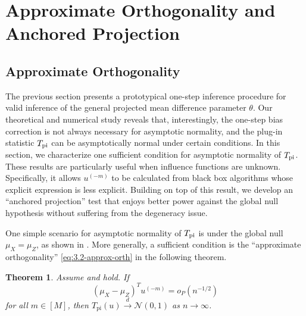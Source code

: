 \documentclass[11pt]{article}
\newtheorem{theorem}{Theorem}[section]
\begin{document}
\section{Approximate Orthogonality and Anchored Projection }\label{section: app orthogonality}


\subsection{Approximate Orthogonality}\label{subsec:3.1-approx-orth}

The previous section presents a prototypical one-step inference procedure for valid inference of the general projected mean difference parameter $\theta$. Our theoretical and numerical study reveals that, interestingly, the one-step bias correction is not always necessary for asymptotic normality, and the plug-in statistic $T_{\rm pi}$ can be asymptotically normal under certain conditions. In this section, we characterize one sufficient condition for asymptotic normality of $T_{\rm pi}$. These results are particularly useful when influence functions are unknown. Specifically, it allows $u^{(-m)}$ to be calculated from black box algorithms whose explicit expression is less explicit. Building on top of this result, we develop an ``anchored projection'' test that enjoys better power against the global null hypothesis without suffering from the degeneracy issue.

One simple scenario for asymptotic normality of $T_{\rm pi}$ is under the global null $\mu_X = \mu_Z$, as shown in .  More generally, a sufficient condition is the ``approximate orthogonality'' \eqref{eq:3.2-approx-orth} in the following theorem.

\begin{theorem}\label{th: approximate orthogonal}
    Assume  and  hold. If 
    \begin{equation}
        \label{eq:3.2-approx-orth}
        (\mu_X-\mu_Z)^T u^{(-m)} = o_P(n^{-1/2})
    \end{equation}
    for all $m\in[M]$, then
     $T_{\mathrm{pi}}(u) \xrightarrow{d} \mathcal{N}(0,1)$ as $n \rightarrow \infty$.
\end{theorem}
\end{document}
